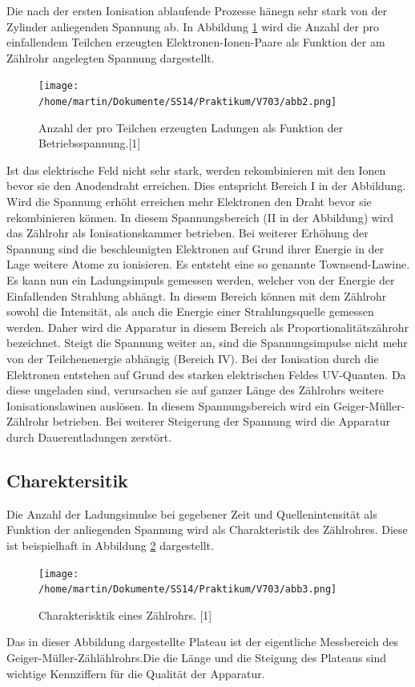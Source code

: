 \documentclass[11pt,ngerman,a4paper]{article}
\begin{document}
Die nach der ersten Ionisation ablaufende Prozesse hänegn sehr stark von der Zylinder anliegenden Spannung ab. In Abbildung \ref{abb2} wird die Anzahl der pro einfallendem Teilchen erzeugten Elektronen-Ionen-Paare als Funktion der am Zählrohr angelegten Spannung dargestellt.
\begin{figure}[htp]
\centering
\texttt{[image: /home/martin/Dokumente/SS14/Praktikum/V703/abb2.png]}
\caption{Anzahl der pro Teilchen erzeugten Ladungen als Funktion der Betriebsspannung.[1]}
\label{abb2}
\end{figure}
Ist das elektrische Feld nicht sehr stark, werden rekombinieren mit den Ionen bevor sie den Anodendraht erreichen. Dies entspricht Bereich I in der Abbildung. Wird die Spannung erhöht erreichen mehr Elektronen den Draht bevor sie rekombinieren können. In diesem Spannungsbereich (II in der Abbildung) wird das Zählrohr als Ionisationskammer betrieben. Bei weiterer Erhöhung der Spannung sind  die beschleunigten Elektronen auf Grund ihrer Energie in der Lage weitere Atome zu ionisieren. Es entsteht eine so genannte Townsend-Lawine. Es kann nun ein Ladungsimpuls gemessen werden, welcher von der Energie der Einfallenden Strahlung abhängt. In diesem Bereich können mit dem Zählrohr sowohl die Intensität, als auch die Energie einer Strahlungsquelle gemessen werden. Daher wird die Apparatur in diesem Bereich als Proportionalitätszährohr bezeichnet. 
Steigt die Spannung weiter an, sind die Spannungsimpulse nicht mehr von der Teilchenenergie abhängig (Bereich IV). Bei der Ionisation durch die Elektronen entstehen auf Grund des starken elektrischen Feldes UV-Quanten. Da diese ungeladen sind, verursachen sie auf ganzer Länge des Zählrohrs weitere Ionisationslawinen auslösen. In diesem Spannungsbereich wird ein Geiger-Müller-Zählrohr betrieben.
Bei weiterer Steigerung der Spannung wird die Apparatur durch Dauerentladungen zerstört.
\subsection{Charektersitik}
Die Anzahl der Ladungsimulse bei gegebener Zeit und Quellenintensität als Funktion der anliegenden Spannung wird als Charakteristik des Zählrohres. Diese ist beispielhaft in Abbildung \ref{abb3} dargestellt.
\begin{figure}[htp]
\centering
\texttt{[image: /home/martin/Dokumente/SS14/Praktikum/V703/abb3.png]}
\caption{Charakterisktik eines Zählrohrs. [1]}
\label{abb3}
\end{figure}
Das in dieser Abbildung dargestellte Plateau ist der eigentliche Messbereich des Geiger-Müller-Zählählrohrs.Die die Länge und die Steigung des Plateaus sind wichtige Kennziffern für die Qualität der Apparatur.
 
\end{document}
